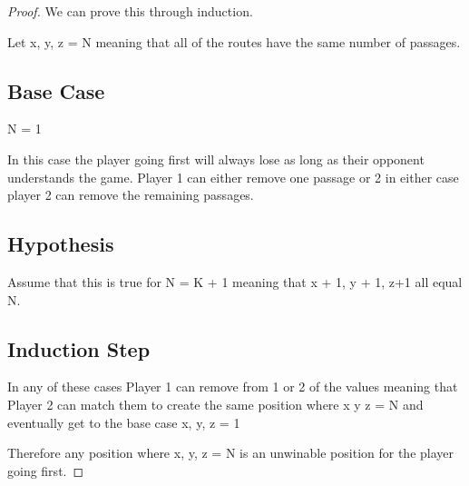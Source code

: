 \documentclass[answers]{exam}
\begin{document}
\begin{questions}
\begin{solution}
            \begin{proof}
                We can prove this through induction. 

                Let x, y, z = N meaning that all of the routes have the same number of passages. 

                \subsection*{Base Case}
                N = 1


                In this case the player going first will always lose as long as their opponent understands the game. Player 1 can either remove one passage or 2 in either case player 2 can remove the remaining passages.

                \subsection*{Hypothesis}

                Assume that this is true for N = K + 1 meaning that x + 1, y + 1, z+1 all equal N.

				\subsection*{Induction Step}
                
                In any of these cases Player 1 can remove from 1 or 2 of the values meaning that Player 2 can match them to create the same position where x y z = N and eventually get to the base case x, y, z = 1

                Therefore any position where x, y, z = N is an unwinable position for the player going first. 


\end{proof}
\end{solution}
\end{questions}
\end{document}
